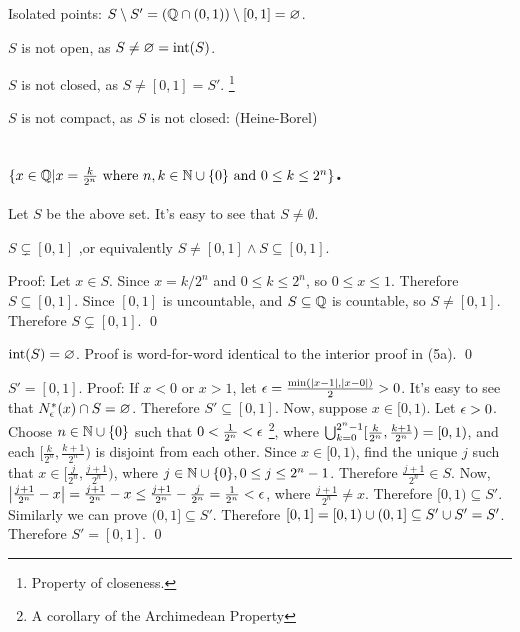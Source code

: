 \documentclass[10pt, letterpaper, titlepage]{article}
\begin{document}
\begin{multicols}{2}
            Isolated points: 
            $S \setminus S' = (\mathbb{Q} \cap (0,1)) \setminus [0,1] = \varnothing$. 
    
            $S$ is not open, as $S \neq \varnothing = \textrm{int}(S)$. 
    
            $S$ is not closed, as $S \neq [0,1] = S'$.
            \footnote{Property of closeness.}
    
            $S$ is not compact, as $S$ is not closed: (Heine-Borel)

        \subsection{$\{ x \in \mathbb{Q} | x = \frac{k}{2^n} 
          \text{ where } n,k \in \mathbb{N} \cup \{ 0 \} \text{ and } 0 \leq k \leq 2^n \}$.}
          Let $S$ be the above set. It's easy to see that $S \neq \emptyset$.

          \begin{lemma}
            $S \subsetneq [0,1]$
            ,or equivalently $S \neq [0,1] \land S \subseteq [0,1]$.
          \end{lemma}
          Proof:
          Let $x \in S$.
          Since $x = k/2^n$ and $0\leq k\leq 2^n$, 
          so $0\leq x \leq 1$.
          Therefore $S \subseteq [0,1]$.
          Since $[0,1]$ is uncountable,
          and $S \subseteq \mathbb{Q}$ is countable,
          so $S \neq [0,1]$.
          Therefore $S \subsetneq [0,1]$.
          \qed

          $\textrm{int}(S) = \varnothing$. 
          Proof is word-for-word identical to the interior proof in (5a).
          \qed

          $S' = [0,1]$. Proof: 
          If $x < 0$ or $x > 1$, 
          let $\epsilon = \frac{\min(\left|x-1\right|, \left|x-0\right|)}{2} > 0$.
          It's easy to see that $N_\epsilon^*(x) \cap S = \varnothing$.
          Therefore $S' \subseteq [0,1]$.
          Now, suppose $x \in [0,1)$.
          Let $\epsilon > 0$.
          Choose $n \in \mathbb{N} \cup \{ 0 \}$
          such that $0 < \frac{1}{2^n} < \epsilon$
          \footnote{A corollary of the Archimedean Property},
          where 
          $\bigcup_{k = 0}^{2^n - 1} [\frac{k}{2^n}, \frac{k+1}{2^n}) = [0,1)$,
          and each $[\frac{k}{2^n}, \frac{k+1}{2^n})$ is disjoint from each other.
          Since $x \in [0,1)$,
          find the unique $j$ 
          such that $x \in [\frac{j}{2^n}, \frac{j+1}{2^n})$,
          where $j \in \mathbb{N} \cup \{ 0 \}, 0 \leq j \leq 2^n-1$.
          Therefore $\frac{j+1}{2^n} \in S$.
          Now, $\left|\frac{j+1}{2^n} - x\right|
          = \frac{j+1}{2^n} - x 
          \leq \frac{j+1}{2^n} - \frac{j}{2^n}
          = \frac{1}{2^n}
          < \epsilon$,
          where $\frac{j+1}{2^n} \neq x$.
          Therefore $[0,1) \subseteq S'$.
          Similarly we can prove $(0,1] \subseteq S'$.
          Therefore $[0,1] = [0,1) \cup (0,1] \subseteq S' \cup S' = S'$.
          Therefore $S' = [0,1]$.
          \qed


\end{multicols}
\end{document}
